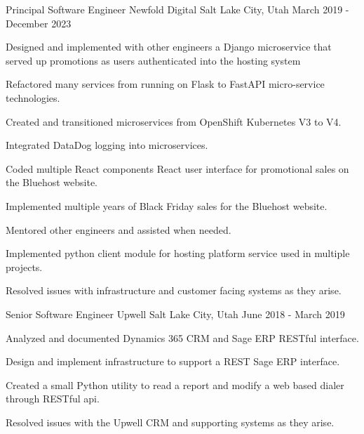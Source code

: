 \begin{cventries}
\cventry
{Principal Software Engineer} %
{Newfold Digital} %
{Salt Lake City, Utah} %
{March 2019 - December 2023} %
{
	\begin{cvitems} %
		\item {Designed and implemented with other engineers a Django microservice that served up promotions as users authenticated into the hosting system}
		\item {Refactored many services from running on Flask to FastAPI micro-service technologies.}
		\item {Created and transitioned microservices from OpenShift Kubernetes V3 to V4.}
		\item {Integrated DataDog logging into microservices.}
		\item {Coded multiple React components React user interface for promotional sales on the Bluehost website.}
		\item {Implemented multiple years of Black Friday sales for the Bluehost website.}
		\item {Mentored other engineers and assisted when needed.}
		\item {Implemented python client module for hosting platform service used in multiple projects.}
		\item {Resolved issues with infrastructure and customer facing systems as they arise.}
	\end{cvitems}
}

\cventry
{Senior Software Engineer} %
{Upwell} %
{Salt Lake City, Utah} %
{June 2018 - March 2019} %
{
	\begin{cvitems} %
		\item {Analyzed and documented Dynamics 365 CRM and Sage ERP RESTful interface.}
		\item {Design and implement infrastructure to support a REST Sage ERP interface.}
		\item {Created a small Python utility to read a report and modify a web based dialer through RESTful api.}
		\item {Resolved issues with the Upwell CRM and supporting systems as they arise.}
	\end{cvitems}
}


\end{cventries}
